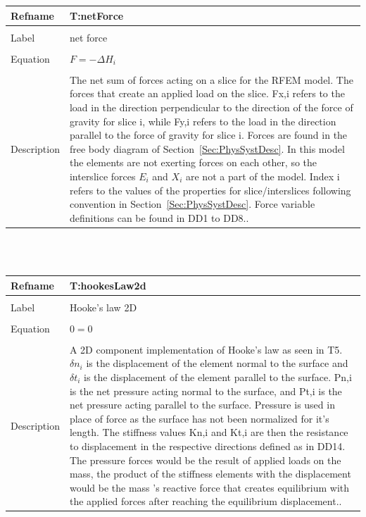 \documentclass[12pt]{article}
\begin{document}
\noindent \begin{minipage}{\textwidth}
\begin{tabular}{p{} p{}}
\toprule \textbf{Refname} & \textbf{T:netForce}
\label{T:netForce}
\\ \midrule \\
Label & net force
\\ \midrule \\
Equation & $F=-\Delta{}H_{i}$
\\ \midrule \\
Description & The net sum of forces acting on a slice for the RFEM model. The forces that create an applied load on the slice. Fx,i refers to the load in the direction perpendicular to the direction of the force of gravity for slice i, while Fy,i refers to the load in the direction parallel to the force of gravity for slice i. Forces are found in the free body diagram of Section~\ref{Sec:PhysSystDesc}. In this model the elements are not exerting forces on each other, so the interslice forces $E_{i}$ and $X_{i}$ are not a part of the model. Index i refers to the values of the properties for slice/interslices following convention in Section~\ref{Sec:PhysSystDesc}. Force variable definitions can be found in DD1 to DD8..
\\ \bottomrule \end{tabular}
\end{minipage}\\
~\newline
\noindent \begin{minipage}{\textwidth}
\begin{tabular}{p{} p{}}
\toprule \textbf{Refname} & \textbf{T:hookesLaw2d}
\label{T:hookesLaw2d}
\\ \midrule \\
Label & Hooke's law 2D
\\ \midrule \\
Equation & $0=0$
\\ \midrule \\
Description & A 2D component implementation of Hooke's law as seen in T5. $\delta{}n_{i}$ is the displacement of the element normal to the surface and $\delta{}t_{i}$ is the displacement of the element parallel to the surface. Pn,i is the net pressure acting normal to the surface, and Pt,i is the net pressure acting parallel to the surface. Pressure is used in place of force as the surface has not been normalized for it's length. The stiffness values Kn,i and Kt,i are then the resistance to displacement in the respective directions defined as in DD14. The pressure forces would be the result of applied loads on the mass, the product of the stiffness elements with the displacement would be the mass 's reactive force that creates equilibrium with the applied forces after reaching the equilibrium displacement..
\\ \bottomrule \end{tabular}
\end{minipage}\\
\end{document}
